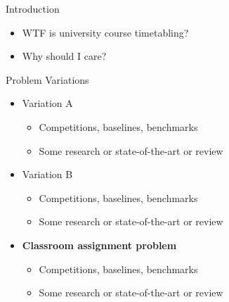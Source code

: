 \documentclass{beamer}
\begin{document}
\capa


\begin{frame}{Introduction}
\begin{itemize}
    \item WTF is university course timetabling?
    \item Why should I care?
\end{itemize}
\end{frame}


\begin{frame}{Problem Variations}
\begin{itemize}
\item Variation A
    \begin{itemize}
    \item Competitions, baselines, benchmarks
    \item Some research or state-of-the-art or review
    \end{itemize}
\item Variation B
    \begin{itemize}
    \item Competitions, baselines, benchmarks
    \item Some research or state-of-the-art or review
    \end{itemize}
\item \textbf{Classroom assignment problem}
    \begin{itemize}
    \item Competitions, baselines, benchmarks
    \item Some research or state-of-the-art or review
    \end{itemize}
\end{itemize}
\end{frame}
\end{document}
